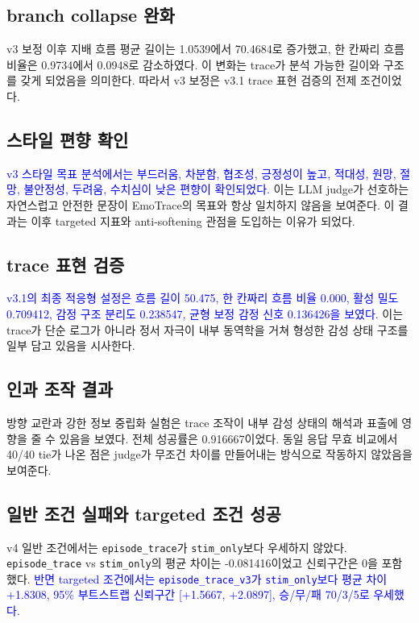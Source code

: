 ﻿\documentclass[11pt,a4paper]{article}
\newcommand{\eng}[1]{\texttt{#1}}
\begin{document}
\subsection{branch collapse 완화}

v3 보정 이후 지배 흐름 평균 길이는 1.0539에서 70.4684로 증가했고, 한 칸짜리 흐름 비율은 0.9734에서 0.0948로 감소하였다. 이 변화는 trace가 분석 가능한 길이와 구조를 갖게 되었음을 의미한다. 따라서 v3 보정은 v3.1 trace 표현 검증의 전제 조건이었다.

\subsection{스타일 편향 확인}

\textcolor{blue}{v3 스타일 목표 분석에서는 부드러움, 차분함, 협조성, 긍정성이 높고, 적대성, 원망, 절망, 불안정성, 두려움, 수치심이 낮은 편향이 확인되었다.} 이는 LLM judge가 선호하는 자연스럽고 안전한 문장이 EmoTrace의 목표와 항상 일치하지 않음을 보여준다. 이 결과는 이후 targeted 지표와 anti-softening 관점을 도입하는 이유가 되었다.

\subsection{trace 표현 검증}

\textcolor{blue}{v3.1의 최종 적응형 설정은 흐름 길이 50.475, 한 칸짜리 흐름 비율 0.000, 활성 밀도 0.709412, 감정 구조 분리도 0.238547, 균형 보정 감정 신호 0.136426을 보였다.} 이는 trace가 단순 로그가 아니라 정서 자극이 내부 동역학을 거쳐 형성한 감성 상태 구조를 일부 담고 있음을 시사한다.

\subsection{인과 조작 결과}

방향 교란과 강한 정보 중립화 실험은 trace 조작이 내부 감성 상태의 해석과 표출에 영향을 줄 수 있음을 보였다. 전체 성공률은 0.916667이었다. 동일 응답 무효 비교에서 40/40 tie가 나온 점은 judge가 무조건 차이를 만들어내는 방식으로 작동하지 않았음을 보여준다.

\subsection{일반 조건 실패와 targeted 조건 성공}

v4 일반 조건에서는 \eng{episode\_trace}가 \eng{stim\_only}보다 우세하지 않았다. \eng{episode\_trace} vs \eng{stim\_only}의 평균 차이는 -0.081416이었고 신뢰구간은 0을 포함했다. \textcolor{blue}{반면 targeted 조건에서는 \eng{episode\_trace\_v3}가 \eng{stim\_only}보다 평균 차이 +1.8308, 95\% 부트스트랩 신뢰구간 [+1.5667, +2.0897], 승/무/패 70/3/5로 우세했다.}
\end{document}
